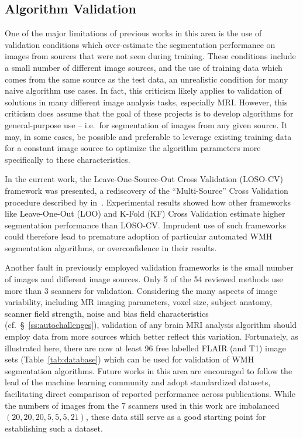 \subsection{Algorithm Validation}
One of the major limitations of previous works in this area
is the use of validation conditions which over-estimate
the segmentation performance on images from sources that
were not seen during training.
These conditions include a small number of different image sources,
and the use of training data which comes from the same source as the test data,
an unrealistic condition for many naive algorithm use cases.
In fact, this criticism likely applies to
validation of solutions in many different image analysis tasks, especially MRI.
However, this criticism does assume that the goal of these projects is to develop
algorithms for general-purpose use
-- i.e.\ for segmentation of images from any given source.
It may, in some cases, be possible and preferable to
leverage existing training data for a constant image source
to optimize the algorithm parameters more specifically to these characteristics.
\par
In the current work, the Leave-One-Source-Out Cross Validation (LOSO-CV) framework was presented,
a rediscovery of the ``Multi-Source'' Cross Validation procedure
described by \citeauthor{Geras2013} in~\cite{Geras2013}.
Experimental results showed how other frameworks like
Leave-One-Out (LOO) and K-Fold (KF) Cross Validation
estimate higher segmentation performance than LOSO-CV.
Imprudent use of such frameworks could therefore lead to
premature adoption of particular automated WMH segmentation algorithms,
or overconfidence in their results.
\par
Another fault in previously employed validation frameworks is
the small number of images and different image sources.
Only 5 of the 54 reviewed methods use more than 3 scanners for validation.
Considering the many aspects of image variability, including
MR imaging parameters,
voxel size,
subject anatomy,
scanner field strength, noise and bias field characteristics
(cf.~\S~\ref{ss:autochallenges}),
validation of any brain MRI analysis algorithm
should employ data from more sources which better reflect this variation.
Fortunately, as illustrated here, there are now at least 96 free labelled FLAIR (and T1) image sets
(Table~\ref{tab:database})
which can be used for validation of WMH segmentation algorithms.
Future works in this area are encouraged to follow the lead of the machine learning community
and adopt standardized datasets, facilitating direct comparison of reported performance
across publications.
While the numbers of images from the 7 scanners used in this work are imbalanced
$(20,20,20,5,5,5,21)$,
these data still serve as a good starting point for establishing such a dataset.
